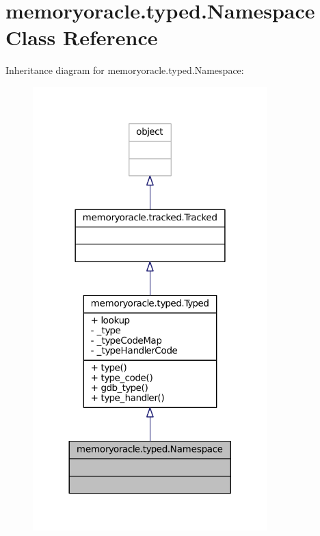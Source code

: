 \hypertarget{classmemoryoracle_1_1typed_1_1Namespace}{}\section{memoryoracle.\+typed.\+Namespace Class Reference}
\label{classmemoryoracle_1_1typed_1_1Namespace}


Inheritance diagram for memoryoracle.\+typed.\+Namespace\+:\nopagebreak
\begin{figure}[H]
\begin{center}
\leavevmode
\includegraphics[width=257pt]{classmemoryoracle_1_1typed_1_1Namespace__inherit__graph}
\end{center}
\end{figure}



